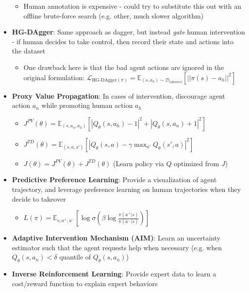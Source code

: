 \documentclass{article}
\providecommand{\tightlist}{%
  \setlength{\itemsep}{\GlobalItemSep}\setlength{\parskip}{\GlobalListParSkip}}
\newlength{\GlobalItemSep}
\newlength{\GlobalListParSkip}
\begin{document}
\begin{multicols}{2}
\begin{itemize}
  \begin{itemize}
  \tightlist
  \item
    Human annotation is expensive - could try to substitute this out
    with an offline brute-force search (e.g. other, much slower
    algorithm)
  \end{itemize}
\item
  \textbf{HG-DAgger}: Same approach as dagger, but instead \emph{gate}
  human intervention - if human decides to take control, then record
  their state and actions into the dataset

  \begin{itemize}
  \tightlist
  \item
    One drawback here is that the bad agent actions are ignored in the
    original formulation:
    \(\mathcal{L}_{\text{HG-DAgger}(\pi)} = \mathbb{E}_{(s, a_h) \sim \mathcal{D}_{\text{takeover}}}[||\pi(s) - a_h||^2]\)
  \end{itemize}
\item
  \textbf{Proxy Value Propagation}: In cases of intervention, discourage
  agent action \(a_n\) while promoting human action \(a_h\)

  \begin{itemize}
  \tightlist
  \item
    \(J^{PV}(\theta) = \mathbb{E}_{(s, a_n, a_h)}[|Q_\theta (s, a_h) - 1|^2 + |Q_\theta(s, a_n) + 1|^2]\)
  \item
    \(J^{TD}(\theta) = \mathbb{E}_{(s, a, s')}[|Q_\theta(s,a) - \gamma \max_{a'} Q_\theta (s', a)|^2]\)
  \item
    \(J(\theta) = J^{PV}(\theta) + J^{TD}(\theta)\) (Learn policy via
    \(Q\) optimized from \(J\))
  \end{itemize}
\item
  \textbf{Predictive Preference Learning}: Provide a visualization of
  agent trajectory, and leverage preference learning on human
  trajectories when they decide to takeover

  \begin{itemize}
  \tightlist
  \item
    \(L(\pi) = \mathbb{E}_{s, a^+, a^-} [\log \sigma (\beta \log \frac{\pi(a^+ | s)}{\pi (a^- | s)})]\)
  \end{itemize}
\item
  \textbf{Adaptive Intervention Mechanism (AIM)}: Learn an uncertainty
  estimator such that the agent requests help when necessary (e.g. when
  \(Q_\theta (s, a_n) < \delta\) quantile of \(Q_\theta(s, a_n)\))
\item
  \textbf{Inverse Reinforcement Learning}: Provide expert data to learn
  a cost/reward function to explain expert behaviors


\end{itemize}
\end{multicols}
\end{document}
